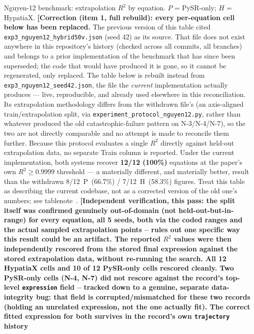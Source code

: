\documentclass[twoside,11pt]{article}
\newcommand{\Rsq}{R^{2}}
\begin{document}
\begin{table}[h]
\centering
\caption{Nguyen-12 benchmark: extrapolation $\Rsq$ by equation.
$P$ = PySR-only; $H$ = HypatiaX.
\textbf{[Correction (item 1, full rebuild): every per-equation cell
below has been replaced.} The previous version of this table cited
\texttt{exp3\_nguyen12\_hybrid50v.json} (seed 42) as its source. That file
does not exist anywhere in this repository's history (checked across all
commits, all branches) and belongs to a prior implementation of the
benchmark that has since been superseded; the code that would have
produced it is gone, so it cannot be regenerated, only replaced. The
table below is rebuilt instead from
\texttt{exp3\_nguyen12\_seed42.json}, the file the \emph{current}
implementation actually produces --- live, reproducible, and already
used elsewhere in this reconciliation. Its extrapolation methodology
differs from the withdrawn file's (an axis-aligned train/extrapolation
split, via \texttt{experiment\_protocol\_nguyen12.py}, rather than
whatever produced the old catastrophic-failure pattern on N-3/N-4/N-7),
so the two are not directly comparable and no attempt is made to
reconcile them further. Because this protocol evaluates a single $\Rsq$
directly against held-out extrapolation data, no separate Train column
is reported. Under the current implementation, both systems recover
\textbf{12/12 (100\%)} equations at the paper's own $\Rsq\ge0.9999$
threshold --- a materially different, and materially better, result than
the withdrawn 8/12~P~(66.7\%) / 7/12~H~(58.3\%) figures. Treat this table
as describing the current codebase, not as a corrected version of the
old one's numbers; see tablenote~\ddag.
\textbf{[Independent verification, this pass: the split itself was
confirmed genuinely out-of-domain (not held-out-but-in-range) for every
equation, all 5 seeds, both via the coded ranges and the actual sampled
extrapolation points -- rules out one specific way this result could be
an artifact. The reported $\Rsq$ values were then independently rescored
from the stored final expression against the stored extrapolation data,
without re-running the search. All 12 HypatiaX cells and 10 of 12
PySR-only cells rescored cleanly. Two PySR-only cells (N-4, N-7) did not
rescore against the record's top-level \texttt{expression} field --
tracked down to a genuine, separate data-integrity bug: that field is
corrupted/mismatched for these two records (holding an unrelated
expression, not the one actually fit). The correct fitted expression for
both survives in the record's own \texttt{trajectory} history
}}
\end{table}
\end{document}
